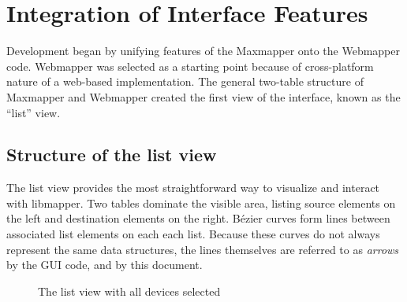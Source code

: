 
\section{Integration of Interface Features} %
\label{sec:integration_of_interface_features}

Development began by unifying features of the Maxmapper onto the Webmapper code. Webmapper was selected as a starting point because of cross-platform nature of a web-based implementation. The general two-table structure of Maxmapper and Webmapper created the first view of the interface, known as the ``list'' view.

	\subsection{Structure of the list view} %
	\label{sub:the_list_view}

The list view provides the most straightforward way to visualize and interact with libmapper. Two tables dominate the visible area, listing source elements on the left and destination elements on the right. B\'ezier curves form lines between associated list elements on each each list. Because these curves do not always represent the same data structures, the lines themselves are referred to as \emph{arrows} by the GUI code, and by this document.

\begin{figure}[ht]
\centering
\caption{The list view with all devices selected}
\label{fig:list_view_all_devices}
\end{figure}

